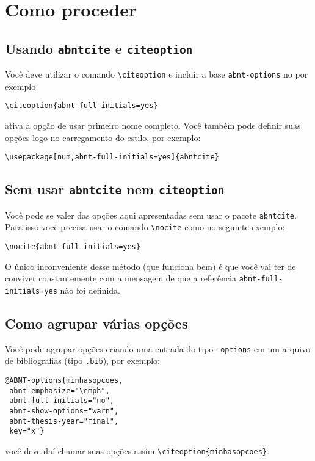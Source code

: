 \documentclass[espacosimples]{abnt}
\begin{document}
\section{Como proceder}

\subsection{Usando {\tt abntcite} e {\tt citeoption}}

Você deve utilizar o comando \verb+\citeoption+ e
incluir a base {\tt abnt-options} no \verb++
por exemplo
\begin{verbatim}
\citeoption{abnt-full-initials=yes}
\end{verbatim}
ativa a opção de usar primeiro nome completo.
Você também pode definir suas opções logo no carregamento do estilo,
por exemplo:
\begin{verbatim}
\usepackage[num,abnt-full-initials=yes]{abntcite}
\end{verbatim}

\subsection{Sem usar {\tt abntcite} nem {\tt citeoption}}

Você pode se valer das opções aqui apresentadas sem usar o pacote {\tt abntcite}.
Para isso você precisa usar o comando \verb+\nocite+ como no seguinte
exemplo:
\begin{verbatim}
\nocite{abnt-full-initials=yes}
\end{verbatim}
O único inconveniente desse método (que funciona bem) é que você vai ter
de conviver constantemente com a mensagem de que a referência {\tt abnt-full-initials=yes}
não foi definida.


\subsection{Como agrupar várias opções}

Você pode agrupar opções criando uma entrada do tipo {\tt \@ABNT-options}
em um arquivo de bibliografias (tipo {\tt .bib}), por exemplo:
\begin{verbatim}
@ABNT-options{minhasopcoes,
 abnt-emphasize="\emph",
 abnt-full-initials="no",
 abnt-show-options="warn",
 abnt-thesis-year="final",
 key="x"}
\end{verbatim}

você deve daí chamar suas opções assim \verb+\citeoption{minhasopcoes}+.
\end{document}
